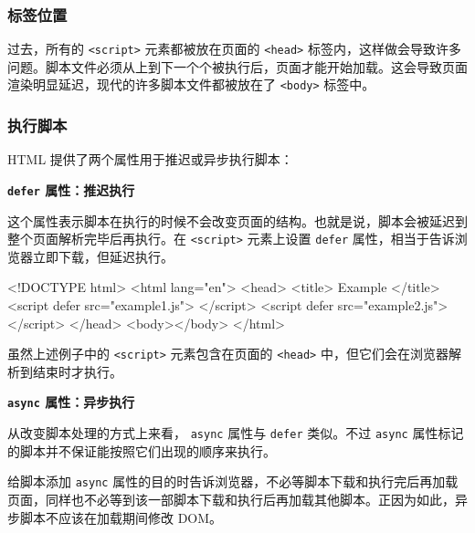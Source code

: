 \subsubsection{标签位置}

过去，所有的 \texttt{<script>} 元素都被放在页面的 \texttt{<head>} 标签内，这样做会导致许多问题。脚本文件必须从上到下一个个被执行后，页面才能开始加载。这会导致页面渲染明显延迟，现代的许多脚本文件都被放在了 \texttt{<body>} 标签中。

\subsubsection{执行脚本}

HTML 提供了两个属性用于推迟或异步执行脚本：

\noindent\textbf{\texttt{defer} 属性：推迟执行}

这个属性表示脚本在执行的时候不会改变页面的结构。也就是说，脚本会被延迟到整个页面解析完毕后再执行。在 \texttt{<script>} 元素上设置 \texttt{defer} 属性，相当于告诉浏览器立即下载，但延迟执行。

\begin{HTML}
<!DOCTYPE html>
<html lang="en">
  <head>
    <title> Example </title>
    <script defer src="example1.js"> </script>
    <script defer src="example2.js"> </script>
  </head>
  <body></body>
</html>
\end{HTML}

虽然上述例子中的 \texttt{<script>} 元素包含在页面的 \texttt{<head>} 中，但它们会在浏览器解析到结束时才执行。


\noindent\textbf{\texttt{async} 属性：异步执行}

从改变脚本处理的方式上来看， \texttt{async} 属性与 \texttt{defer} 类似。不过 \texttt{async} 属性标记的脚本并不保证能按照它们出现的顺序来执行。

给脚本添加 \texttt{async} 属性的目的时告诉浏览器，不必等脚本下载和执行完后再加载页面，同样也不必等到该一部脚本下载和执行后再加载其他脚本。正因为如此，异步脚本不应该在加载期间修改 DOM。


